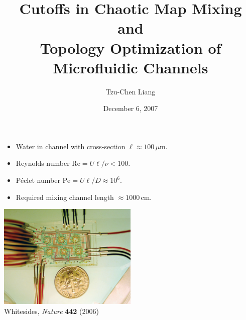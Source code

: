 \documentclass[12pt,t]{beamer}
\begin{document}
\title[Optimal Microfluidic Mixing and Cutoff]{Cutoffs in Chaotic Map Mixing and \\Topology Optimization of Microfluidic Channels}
\author{Tzu-Chen Liang}
 
\date{December 6, 2007}
\frame{\titlepage}

\begin{frame}
  \begin{itemize}
  \item Water in channel with cross-section $\ell \approx 100\,\mu\text{m}$.
  \item Reynolds number $\text{Re} = U\ell/\nu < 100$.
  \item P\'eclet number $\text{Pe} = U\ell/D \approx 10^6$.
  \item Required mixing channel length $\approx 1000\,\text{cm}$.
  \end{itemize}
  \begin{center}
      \includegraphics[width=0.50\textwidth]{microfluidicmixer}\\[-0cm]
      \tiny{Whitesides, \textit{Nature} \textbf{442} (2006)}
  \end{center}
  
\end{frame}
\end{document}
